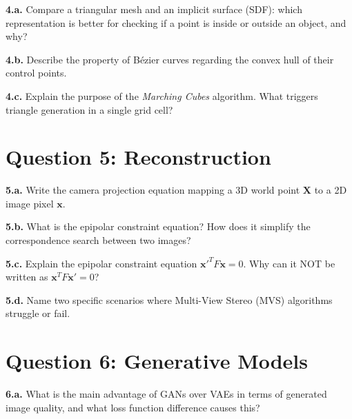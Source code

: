 \documentclass[11pt]{article}
\begin{document}
\textbf{4.a.} Compare a triangular mesh and an implicit surface (SDF): which representation is better for checking if a point is inside or outside an object, and why?

\vspace{2cm}

\textbf{4.b.} Describe the property of Bézier curves regarding the convex hull of their control points.

\vspace{2cm}

\textbf{4.c.} Explain the purpose of the \textit{Marching Cubes} algorithm. What triggers triangle generation in a single grid cell?

\vspace{2.5cm}

\section*{Question 5: Reconstruction}

\textbf{5.a.} Write the camera projection equation mapping a 3D world point $\mathbf{X}$ to a 2D image pixel $\mathbf{x}$.

\vspace{2cm}

\textbf{5.b.} What is the epipolar constraint equation? How does it simplify the correspondence search between two images?

\vspace{2.5cm}

\textbf{5.c.} Explain the epipolar constraint equation $\mathbf{x}'^T F \mathbf{x} = 0$. Why can it NOT be written as $\mathbf{x}^T F \mathbf{x}' = 0$?

\vspace{2cm}

\textbf{5.d.} Name two specific scenarios where Multi-View Stereo (MVS) algorithms struggle or fail.

\vspace{2cm}

\section*{Question 6: Generative Models}

\textbf{6.a.} What is the main advantage of GANs over VAEs in terms of generated image quality, and what loss function difference causes this?
\end{document}
